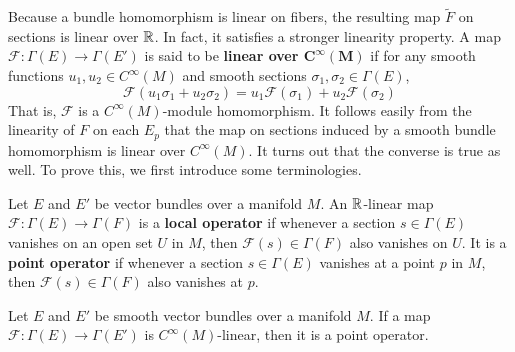 Because a bundle homomorphism is linear on fibers, the resulting map $\widetilde{F}$ on sections is linear over $\mathbb{R}$. In fact, it satisfies a stronger linearity 
property. A map $\mathcal{F}:\Gamma(E)\to\Gamma(E')$ is said to be \textbf{linear over $\bm{C^\infty(M)}$} if for any smooth functions $u_1,u_2\in C^\infty(M)$ and 
smooth sections $\sigma_1,\sigma_2\in\Gamma(E)$,
\[\mathcal{F}(u_1\sigma_1+u_2\sigma_2)=u_1\mathcal{F}(\sigma_1)+u_2\mathcal{F}(\sigma_2)\]
That is, $\mathcal{F}$ is a $C^\infty(M)$-module homomorphism. It follows easily from the linearity of $F$ on each $E_p$ that the map on sections induced by a smooth 
bundle homomorphism is linear over $C^\infty(M)$. It turns out that the converse is true as well. To prove this, we first introduce some terminologies.
\begin{definition}
Let $E$ and $E'$ be vector bundles over a manifold $M$. An $\mathbb{R}$-linear map $\mathcal{F}:\Gamma(E)\to\Gamma(F)$ is a \textbf{local operator} if whenever a section 
$s\in\Gamma(E)$ vanishes on an open set $U$ in $M$, then $\mathcal{F}(s)\in\Gamma(F)$ also vanishes on $U$. It is a \textbf{point operator} if whenever a section 
$s\in\Gamma(E)$ vanishes at a point $p$ in $M$, then $\mathcal{F}(s)\in\Gamma(F)$ also vanishes at $p$.
\end{definition}
\begin{lemma}\label{vector bundle section map pointwise}
Let $E$ and $E'$ be smooth vector bundles over a manifold $M$. If a map $\mathcal{F}:\Gamma(E)\to\Gamma(E')$ is $C^{\infty}(M)$-linear, then it is a point operator.
\end{lemma}
